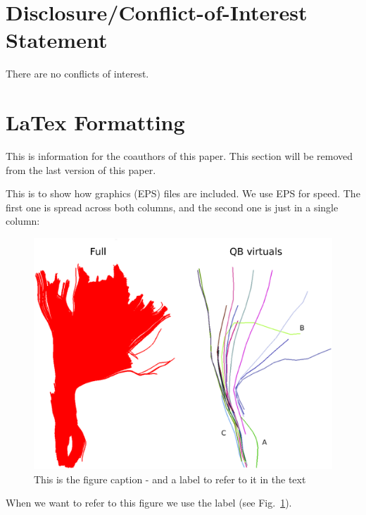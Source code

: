 \documentclass{bioinfo}
\begin{document}
\section*{Disclosure/Conflict-of-Interest Statement}
There are no conflicts of interest.

\section{LaTex Formatting}

This is information for the coauthors of this paper. This section will be removed from the last version of this paper.

This is to show how graphics (EPS) files are included. We use EPS for
speed. The first one is spread across both columns, and the second one
is just in a single column:

\begin{figure}
\centerline{\includegraphics[width=160mm]{Figures/Fig_4_cst_simplification_relabeled_triple.eps}}
\caption{This is the figure caption - and a label to refer to it in the text \label{Fig:big_picture}}
\end{figure}

When we want to refer to this figure we use the label (see Fig.~\ref{Fig:big_picture}).
\end{document}
